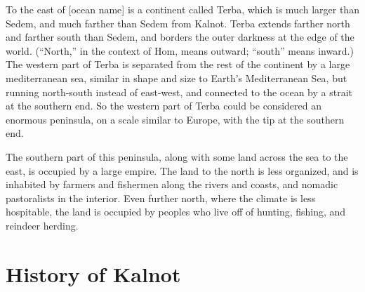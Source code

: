 \documentclass{article}
\begin{document}
To the east of [ocean name] is a continent called Terba, which is much larger than Sedem, and much farther than Sedem from Kalnot. Terba extends farther north and farther south than Sedem, and borders the outer darkness at the edge of the world. (``North,'' in the context of Hom, means outward; ``south'' means inward.) The western part of Terba is separated from the rest of the continent by a large mediterranean sea, similar in shape and size to Earth's Mediterranean Sea, but running north-south instead of east-west, and connected to the ocean by a strait at the southern end. So the western part of Terba could be considered an enormous peninsula, on a scale similar to Europe, with the tip at the southern end.

The southern part of this peninsula, along with some land across the sea to the east, is occupied by a large empire. The land to the north is less organized, and is inhabited by farmers and fishermen along the rivers and coasts, and nomadic pastoralists in the interior. Even further north, where the climate is less hospitable, the land is occupied by peoples who live off of hunting, fishing, and reindeer herding.

\section{History of Kalnot}
\label{history}
\end{document}
